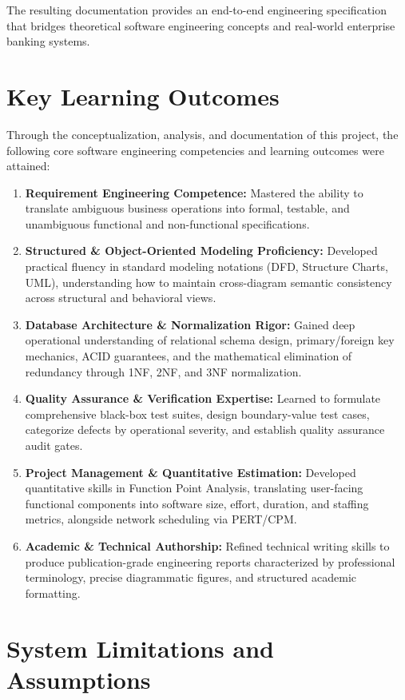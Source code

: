 \documentclass[12pt,a4paper,oneside]{report}
\begin{document}
The resulting documentation provides an end-to-end engineering specification that bridges theoretical software engineering concepts and real-world enterprise banking systems.

\section{Key Learning Outcomes}

Through the conceptualization, analysis, and documentation of this project, the following core software engineering competencies and learning outcomes were attained:

\begin{enumerate}
  \item \textbf{Requirement Engineering Competence:} Mastered the ability to translate ambiguous business operations into formal, testable, and unambiguous functional and non-functional specifications.
  \item \textbf{Structured \& Object-Oriented Modeling Proficiency:} Developed practical fluency in standard modeling notations (DFD, Structure Charts, UML), understanding how to maintain cross-diagram semantic consistency across structural and behavioral views.
  \item \textbf{Database Architecture \& Normalization Rigor:} Gained deep operational understanding of relational schema design, primary/foreign key mechanics, ACID guarantees, and the mathematical elimination of redundancy through 1NF, 2NF, and 3NF normalization.
  \item \textbf{Quality Assurance \& Verification Expertise:} Learned to formulate comprehensive black-box test suites, design boundary-value test cases, categorize defects by operational severity, and establish quality assurance audit gates.
  \item \textbf{Project Management \& Quantitative Estimation:} Developed quantitative skills in Function Point Analysis, translating user-facing functional components into software size, effort, duration, and staffing metrics, alongside network scheduling via PERT/CPM.
  \item \textbf{Academic \& Technical Authorship:} Refined technical writing skills to produce publication-grade engineering reports characterized by professional terminology, precise diagrammatic figures, and structured academic formatting.
\end{enumerate}

\section{System Limitations and Assumptions}
\end{document}
